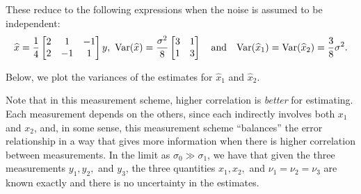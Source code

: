 \documentclass{homework}
\begin{document}
\begin{solution}
These reduce to the following expressions when the noise is assumed to be independent:
$$
  \widehat x = \frac{1}{4} \begin{bmatrix} 2 & 1 & -1 \\ 2 & -1 & 1\end{bmatrix}y,\,\,
  \mathrm{Var}(\widehat x) = 
	\frac{\sigma^2}{8} 
	\begin{bmatrix}3&1\\ 1&3\\ \end{bmatrix}\quad\text{and}\quad
  \mathrm{Var}(\widehat x_1) = \mathrm{Var}(\widehat x_2) = \frac{3}{8} \sigma^2.
$$
\end{solution}


Below, we plot the variances of the estimates for $\hat x_1$ and $\hat x_2$.

\begin{minipage}{.5\textwidth}
\end{minipage}
\hspace{1em}
\begin{minipage}{.5\textwidth}
Note that in this measurement scheme, higher correlation is \emph{better} for estimating. 
Each measurement depends on the others, since each indirectly involves both $x_1$ and $x_2$,  and, in some sense, this measurement scheme ``balances'' the error relationship in a way that gives more information when there is higher correlation between measurements.
In the limit as $\sigma_0 \gg \sigma_1$, we have that given the three measurements $y_1,y_2,$ and $y_3$, the three quantities $x_1, x_2,$ and $\nu_1 = \nu_2 = \nu_3$ are known exactly and there is no uncertainty in the estimates.
\end{minipage}
\end{document}
